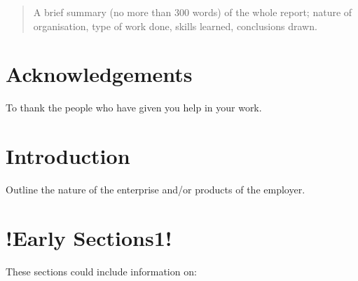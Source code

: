 \documentclass[pdftex, 12pt, a4paper, twoside]{article} %
\let\oldsection\section
\def\section{\cleardoublepage\oldsection}
\begin{document}


\thispagestyle{plain} %
\clearpage\mbox{}\clearpage 

\setcounter{page}{3}




\renewcommand{\abstractname}{Summary}
\begin{abstract}
A brief summary (no more than 300 words) of the whole report; nature of organisation, type of work done, skills learned, conclusions drawn.

\lipsum[1-2]
\end{abstract}

\section*{Acknowledgements}
To thank the people who have given you help in your work.

\lipsum[1-2]



\renewcommand{\contentsname}{Table of Contents}
\tableofcontents
\listoffigures
\listoftables\cleardoublepage


\setcounter{page}{1}


\section{Introduction}
\label{sec:introduction}
Outline the nature of the enterprise and/or products of the employer.
\lipsum[1-2]


\section{!Early Sections1!}
\label{sec:earlysection}
These sections could include information on:
\end{document}

